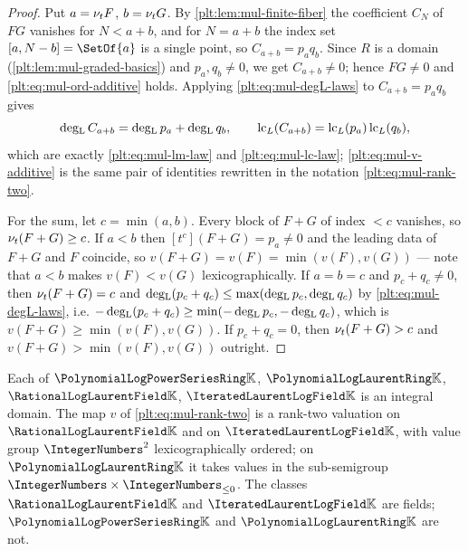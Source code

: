 \begin{proof}
Put $a=\nu_{t} F$, $b=\nu_{t} G$.  By \cref{plt:lem:mul-finite-fiber} the
coefficient $C_N$ of $FG$ vanishes for $N<a+b$, and for $N=a+b$ the index set
$[a,N-b]=\SetOf{a}$ is a single point, so $C_{a+b}=p_aq_b$.  Since $R$ is a
domain (\cref{plt:lem:mul-graded-basics}) and $p_a,q_b\ne0$, we get
$C_{a+b}\ne0$; hence $FG\ne0$ and \eqref{plt:eq:mul-ord-additive} holds.
Applying \eqref{plt:eq:mul-degL-laws} to $C_{a+b}=p_aq_b$ gives
\[
 \operatorname{deg_{L}} C_{a+b}=\operatorname{deg_{L}} p_a+\operatorname{deg_{L}} q_b,
 \qquad
 \operatorname{lc}_L(C_{a+b})=\operatorname{lc}_L(p_a)\operatorname{lc}_L(q_b),
\]
which are exactly \eqref{plt:eq:mul-lm-law} and \eqref{plt:eq:mul-lc-law};
\eqref{plt:eq:mul-v-additive} is the same pair of identities rewritten in the
notation \eqref{plt:eq:mul-rank-two}.

For the sum, let $c=\min(a,b)$.  Every block of $F+G$ of index $<c$ vanishes,
so $\nu_{t}(F+G)\ge c$.  If $a<b$ then $[t^c](F+G)=p_a\ne0$ and the leading
data of $F+G$ and $F$ coincide, so $v(F+G)=v(F)=\min(v(F),v(G))$ --- note
that $a<b$ makes $v(F)<v(G)$ lexicographically.  If $a=b=c$ and
$p_c+q_c\ne0$, then $\nu_{t}(F+G)=c$ and
$\operatorname{deg_{L}}(p_c+q_c)\le\max(\operatorname{deg_{L}} p_c,\operatorname{deg_{L}} q_c)$ by
\eqref{plt:eq:mul-degL-laws}, i.e.
$-\operatorname{deg_{L}}(p_c+q_c)\ge\min(-\operatorname{deg_{L}} p_c,-\operatorname{deg_{L}} q_c)$, which is
$v(F+G)\ge\min(v(F),v(G))$.  If $p_c+q_c=0$, then $\nu_{t}(F+G)>c$ and
$v(F+G)>\min(v(F),v(G))$ outright.
\end{proof}

\begin{corollary}
\label{plt:cor:mul-domain}
Each of $\PLpow$, $\PLlau$, $\PLrat$, $\PLit$ is an integral domain.  The map
$v$ of \eqref{plt:eq:mul-rank-two} is a rank-two valuation on $\PLrat$ and on
$\PLit$, with value group $\IntegerNumbers^2$ lexicographically ordered; on
$\PLlau$ it takes values in the sub-semigroup
$\IntegerNumbers\times\IntegerNumbers_{\le0}$.  The classes $\PLrat$ and
$\PLit$ are fields; $\PLpow$ and $\PLlau$ are not.
\end{corollary}

